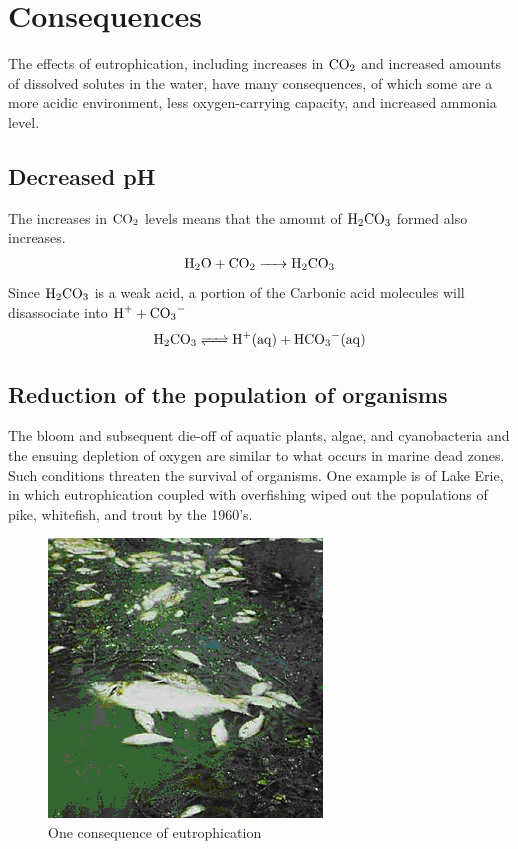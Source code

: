 \documentclass{article}
\begin{document}
\section{Consequences}
The effects of eutrophication, including increases in $\ce{CO2}$ and increased amounts of dissolved solutes in the water, have many consequences, of which some are a more acidic environment, less oxygen-carrying capacity, and increased ammonia level.
    \subsection{Decreased pH}
    The increases in $\ce{CO2}$ levels means that the amount of $\ce{H2CO3}$ formed also increases.
    \begin{align}
        \ce{H2O + CO2 -> H2CO3}
    \end{align}
    Since $\ce{H2CO3}$ is a weak acid, a portion of the Carbonic acid molecules will disassociate into $\ce{H+ + CO3-}$
    \begin{align}
        \ce{H2CO3 <=> H+(aq) + HCO3-(aq)}
    \end{align}
    \subsection{Reduction of the population of organisms}
    The bloom and subsequent die-off of aquatic plants, algae, and cyanobacteria and the ensuing depletion of oxygen are similar to what occurs in marine dead zones.
    Such conditions threaten the survival of organisms. One example is of Lake Erie, in which eutrophication coupled with overfishing wiped out the populations of pike, whitefish, and trout by the 1960's\cite{bio}.
        \begin{figure}[h]
            \centering
            \includegraphics[scale=.5]{deadfish}
            \caption{One consequence of eutrophication}
            \label{fig:deadfish}
        \end{figure}
\end{document}

